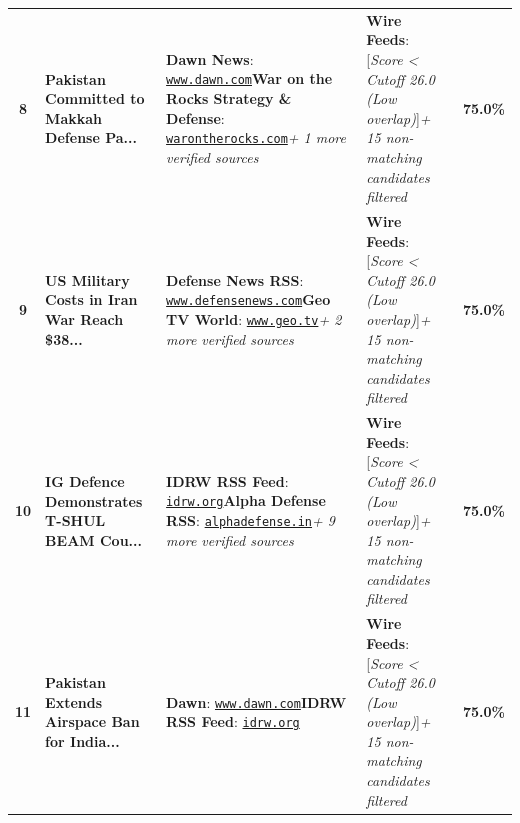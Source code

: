 \documentclass[8.5pt,a4paper]{article}
\begin{document}
{\begin{tabularx}{\textwidth}{@{} c p{3.4cm} p{6.8cm} p{6.8cm} c @{}}
\rowcolor{rowdark}
\textbf{8} & \textbf{Pakistan Committed to Makkah Defense Pa...} & \textbf{Dawn News}: \href{https://www.dawn.com/news/2030603/pakistan-committed-to-implementing-saudi-defence-pact-makkah-agreement-fo}{\texttt{www.dawn.com}}\newline \textbf{War on the Rocks Strategy \& Defense}: \href{https://warontherocks.com/the-mecca-pacts-credibility-gap/}{\texttt{warontherocks.com}}\newline \textit{+ 1 more verified sources} & \textbf{Wire Feeds}: [\textit{Score < Cutoff 26.0 (Low overlap)}]\newline \textit{+ 15 non-matching candidates filtered} & \textbf{75.0\%} \\
\rowcolor{rowlight}
\textbf{9} & \textbf{US Military Costs in Iran War Reach \$38...} & \textbf{Defense News RSS}: \href{https://www.defensenews.com/news/your-military/2026/09/15/iran-war-has-cost-38-billion-depleted-two-thirds-of-us-missile-interceptors-cbo-says/}{\texttt{www.defensenews.com}}\newline \textbf{Geo TV World}: \href{https://www.geo.tv/latest/682247-iran-war-drains-38bn-from-us-as-weapons-stockpiles-face-five-year-replenishment}{\texttt{www.geo.tv}}\newline \textit{+ 2 more verified sources} & \textbf{Wire Feeds}: [\textit{Score < Cutoff 26.0 (Low overlap)}]\newline \textit{+ 15 non-matching candidates filtered} & \textbf{75.0\%} \\
\rowcolor{rowdark}
\textbf{10} & \textbf{IG Defence Demonstrates T-SHUL BEAM Cou...} & \textbf{IDRW RSS Feed}: \href{https://idrw.org/ig-defences-indigenous-t-shul-beam-counter-uas-system-demonstrated-at-indian-air-force-dronathan-2026/}{\texttt{idrw.org}}\newline \textbf{Alpha Defense RSS}: \href{https://alphadefense.in/2026/08/24/paper-planes-of-the-indian-air-force/}{\texttt{alphadefense.in}}\newline \textit{+ 9 more verified sources} & \textbf{Wire Feeds}: [\textit{Score < Cutoff 26.0 (Low overlap)}]\newline \textit{+ 15 non-matching candidates filtered} & \textbf{75.0\%} \\
\rowcolor{rowlight}
\textbf{11} & \textbf{Pakistan Extends Airspace Ban for India...} & \textbf{Dawn}: \href{https://www.dawn.com/news/2030359}{\texttt{www.dawn.com}}\newline \textbf{IDRW RSS Feed}: \href{https://idrw.org/pakistan-extends-airspace-ban-for-indian-aircraft-till-oct-24/}{\texttt{idrw.org}} & \textbf{Wire Feeds}: [\textit{Score < Cutoff 26.0 (Low overlap)}]\newline \textit{+ 15 non-matching candidates filtered} & \textbf{75.0\%} \\

\end{tabularx}}
\end{document}
